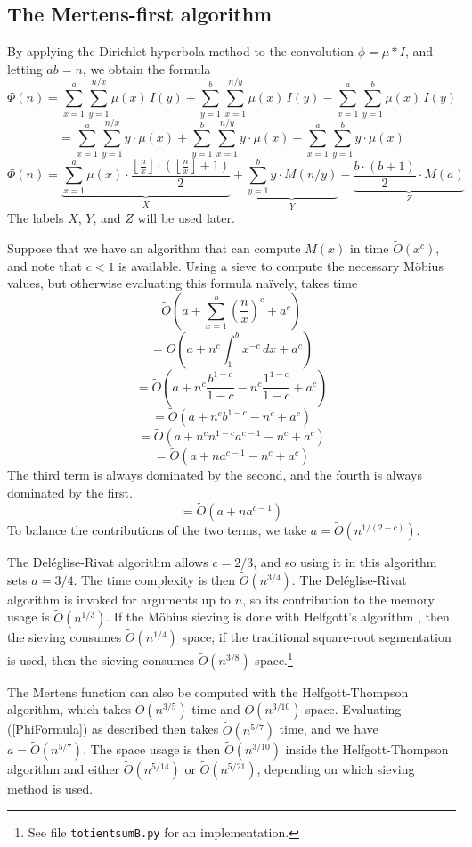 \documentclass[12pt]{article}
\newcommand{\eqn}[1]{\begin{displaymath} #1 \end{displaymath}}
\newcommand{\neqn}[1]{\begin{equation} #1 \end{equation}}
\newcommand{\floor}[1]{{\left\lfloor #1 \right\rfloor}}
\newcommand{\integral}[4]{\displaystyle\int_{#3}^{#4} \! #1 \, d#2}
\newcommand{\floordiv}[2]{\floor{\frac{#1}{#2}}}
\newcommand{\softO}[0]{\widetilde{O}}
\begin{document}
\subsection{The Mertens-first algorithm}

By applying the Dirichlet hyperbola method to the convolution $\phi = \mu * I$, and letting $ab=n$, we obtain the formula
\eqn{\Phi(n) = \sum_{x=1}^{a}\sum_{y=1}^{n/x} \mu(x) \, I(y) + \sum_{y=1}^{b}\sum_{x=1}^{n/y} \mu(x) \, I(y) - \sum_{x=1}^{a}\sum_{y=1}^{b} \mu(x) \, I(y)}
\eqn{ = \sum_{x=1}^{a}\sum_{y=1}^{n/x} y \cdot \mu(x) + \sum_{y=1}^{b}\sum_{x=1}^{n/y} y \cdot \mu(x) - \sum_{x=1}^{a}\sum_{y=1}^{b} y \cdot \mu(x)}
\neqn{\Phi(n) = \underbrace{\sum_{x=1}^{a} \mu(x) \cdot \frac{\floordiv{n}{x} \cdot \left(\floordiv{n}{x} + 1\right)}{2}}_{X} + \underbrace{\sum_{y=1}^{b} y \cdot M(n/y)}_{Y} - \underbrace{\frac{b \cdot (b+1)}{2} \cdot M(a)}_{Z} \label{PhiFormula}}
The labels $X$, $Y$, and $Z$ will be used later.

Suppose that we have an algorithm that can compute $M(x)$ in time $\softO(x^c)$, and note that $c < 1$ is available.  Using a sieve to compute the necessary M\"obius values, but otherwise evaluating this formula na\"{i}vely, takes time
\eqn{\softO\left( a + \sum_{x=1}^b \left(\frac{n}{x}\right)^c + a^c \right)}
\eqn{=\softO\left( a + n^c \integral{x^{-c}}{x}{1}{b} + a^c \right)}
\eqn{=\softO\left( a + n^c\frac{b^{1-c}}{1-c} - n^c\frac{1^{1-c}}{1-c} + a^c \right)}
\eqn{=\softO\left( a + n^c b^{1-c} - n^c + a^c \right)}
\eqn{=\softO\left( a + n^c n^{1-c} a^{c-1} - n^c + a^c \right)}
\eqn{=\softO\left( a + n a^{c-1} - n^c + a^c \right)}
The third term is always dominated by the second, and the fourth is always dominated by the first.
\eqn{=\softO\left( a + n a^{c-1} \right)}
To balance the contributions of the two terms, we take $a = \softO(n^{1/(2-c)})$.

The Del\'{e}glise-Rivat algorithm \cite{DR1996} allows $c=2/3$, and so using it in this algorithm sets $a=3/4$.  The time complexity is then $\softO(n^{3/4})$. 
 The Del\'{e}glise-Rivat algorithm is invoked for arguments up to $n$, so its contribution to the memory usage is $\softO(n^{1/3})$.  If the M\"{o}bius sieving is done with Helfgott's algorithm \cite{Helfgott2020}, then the sieving consumes $\softO(n^{1/4})$ space; if the traditional square-root segmentation is used, then the sieving consumes $\softO(n^{3/8})$ space.\footnote{See file \texttt{totientsumB.py} for an implementation.}

The Mertens function can also be computed with the Helfgott-Thompson algorithm, which takes $\softO(n^{3/5})$ time and $\softO(n^{3/10})$ space.  Evaluating (\ref{PhiFormula}) as described then takes $\softO(n^{5/7})$ time, and we have $a = \softO(n^{5/7})$.  The space usage is then $\softO(n^{3/10})$ inside the Helfgott-Thompson algorithm and either $\softO(n^{5/14})$ or $\softO(n^{5/21})$, depending on which sieving method is used.
\end{document}
